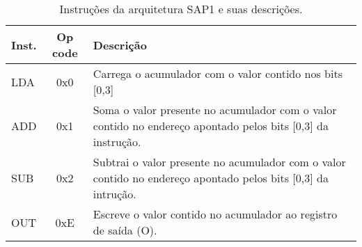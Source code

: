 \begin{table}
  \caption{Instruções da arquitetura SAP1 e suas descrições.}
\begin{tabular*}{0.5\linewidth}{lcp{4cm}}
  \hline
 Inst. & Op code & Descrição \\
 \hline
 LDA         &     0x0 & Carrega o acumulador com o valor contido nos bits [0,3] \\
 ADD         &     0x1 & Soma o valor presente no acumulador com o valor contido no endereço apontado pelos bits [0,3] da instrução. \\
 SUB         &     0x2 & Subtrai o valor presente no acumulador com o valor contido no endereço apontado pelos bits [0,3] da intrução.\\
 OUT         &     0xE & Escreve o valor contido no acumulador ao registro de saída (O). \\ 
 \hline
\end{tabular*}
\label{t-inst}
\end{table}
